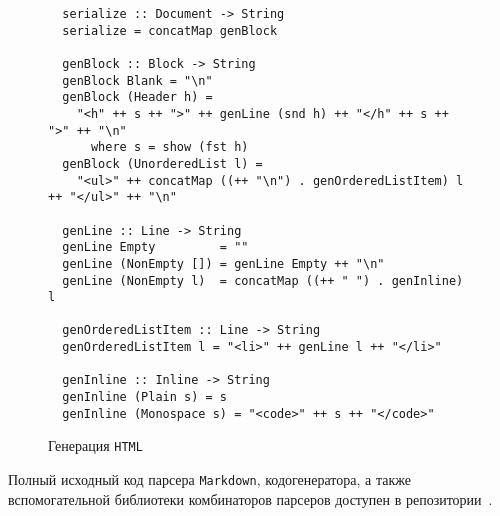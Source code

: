   \begin{figure}[h]
  \begin{lstlisting}
  serialize :: Document -> String
  serialize = concatMap genBlock

  genBlock :: Block -> String
  genBlock Blank = "\n"
  genBlock (Header h) =
    "<h" ++ s ++ ">" ++ genLine (snd h) ++ "</h" ++ s ++ ">" ++ "\n"
      where s = show (fst h)
  genBlock (UnorderedList l) =
    "<ul>" ++ concatMap ((++ "\n") . genOrderedListItem) l ++ "</ul>" ++ "\n"

  genLine :: Line -> String
  genLine Empty         = ""
  genLine (NonEmpty []) = genLine Empty ++ "\n"
  genLine (NonEmpty l)  = concatMap ((++ " ") . genInline) l

  genOrderedListItem :: Line -> String
  genOrderedListItem l = "<li>" ++ genLine l ++ "</li>"

  genInline :: Inline -> String
  genInline (Plain s) = s
  genInline (Monospace s) = "<code>" ++ s ++ "</code>"
  \end{lstlisting}
  \caption{Генерация \lstinline{HTML}}
  \label{listing:HTMLGen}
  \end{figure}

  Полный исходный код парсера \lstinline{Markdown}, кодогенератора, а также вспомогательной библиотеки комбинаторов парсеров доступен в репозитории~\cite{mdParse}.
